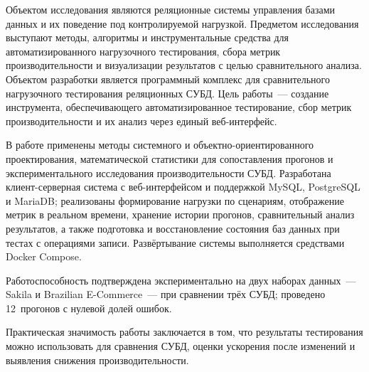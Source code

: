 \abstract %


Объектом исследования являются реляционные системы управления базами данных и их поведение под контролируемой нагрузкой. Предметом исследования выступают методы, алгоритмы и инструментальные средства для автоматизированного нагрузочного тестирования, сбора метрик производительности и визуализации результатов с целью сравнительного анализа. Объектом разработки является программный комплекс для сравнительного нагрузочного тестирования реляционных СУБД. Цель работы~--- создание инструмента, обеспечивающего автоматизированное тестирование, сбор метрик производительности и их анализ через единый веб-интерфейс.

В работе применены методы системного и объектно-ориентированного проектирования, математической статистики для сопоставления прогонов и экспериментального исследования производительности СУБД. Разработана клиент-серверная система с веб-интерфейсом и поддержкой MySQL, PostgreSQL и MariaDB; реализованы формирование нагрузки по сценариям, отображение метрик в реальном времени, хранение истории прогонов, сравнительный анализ результатов, а также подготовка и восстановление состояния баз данных при тестах с операциями записи. Развёртывание системы выполняется средствами Docker Compose.

Работоспособность подтверждена экспериментально на двух наборах данных~--- Sakila и Brazilian E-Commerce~--- при сравнении трёх СУБД; проведено 12~прогонов с нулевой долей ошибок.

Практическая значимость работы заключается в том, что результаты тестирования можно использовать для сравнения СУБД, оценки ускорения после изменений и выявления снижения производительности.